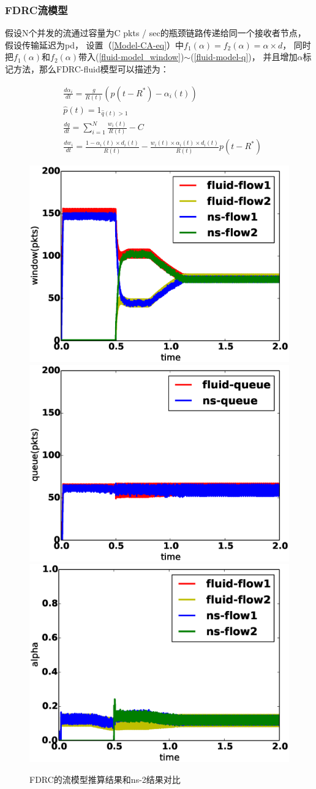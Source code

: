 \subsubsection{FDRC流模型}
假设N个并发的流通过容量为C pkts / sec的瓶颈链路传递给同一个接收者节点，假设传输延迟为pd，
设置（\ref{Model-CA-eq}）中$f_1(\alpha)=f_2(\alpha)=\alpha \times d$，
同时把$f_1(\alpha)$和$f_2(\alpha)$带入(\ref{fluid-model_window})$\sim$(\ref{fluid-model-q})，
并且增加$\alpha$标记方法，那么FDRC-fluid模型可以描述为：

\begin{align}
&\frac{d\alpha_i}{dt}=\frac{g}{R(t)}(p(t-R^*)-\alpha_i(t)) \label{FDRC-model_alpha} \\
&\widehat{p}(t)=1_{\widehat{q}(t)>1}  \label{FDRC-model_mark} \\
&\frac{dq}{dt}= \sum_{i=1}^N{\frac{w_i(t)}{R(t)}}-C \label{FDRC-model_queue}  \\
&\frac{dw_i}{dt}=\frac{1-\alpha_i(t)\times d_{i}(t)}{R(t)}-\frac{w_i(t) \times \alpha_i(t)\times d_i(t)}{R(t)}p(t-R^*)  \label{FDRC-model_window}
\end{align}

\begin{figure}[h]
\centering
{}
 {\includegraphics[width=0.32\columnwidth]{figures/FDRC/model/window.eps}}
{\includegraphics[width=0.32\columnwidth]{figures/FDRC/model/queue.eps}}
\subcaptionbox{$\alpha$}
{\includegraphics[width=0.32\columnwidth]{figures/FDRC/model/alpha.eps}}
\caption{FDRC的流模型推算结果和ns-2结果对比}
\label{fdrc-fluid-model-fig}
\end{figure}

